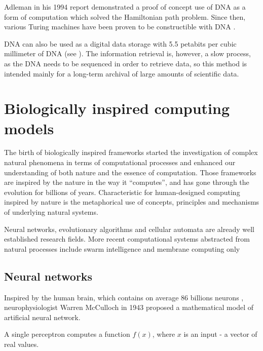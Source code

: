 Adleman in his 1994 report \cite{Adleman1994MolecularComputation} demonstrated a proof of concept use of DNA as a form of computation which solved the Hamiltonian path problem. Since then, various Turing machines have been proven to be constructible with DNA \cite{Kari2000DNAPCP}. 

DNA can also be used as a digital data storage with 5.5 petabits per cubic millimeter of DNA (see \cite{Church2012DNAStorage}). The information retrieval is, however, a slow process, as the DNA needs to be sequenced in order to retrieve data, so this method is intended mainly for a long-term archival of large amounts of scientific data.


\section{Biologically inspired computing models} %
\label{sec:biologically_inspired_computing_models}

The birth of biologically inspired frameworks started the investigation of complex natural phenomena in terms of computational processes and enhanced our understanding of both nature and the essence of computation.
Those frameworks are inspired by the nature in the way it ``computes'', and has gone through the evolution for billions of years. Characteristic for human-designed computing inspired by nature is the metaphorical use of concepts, principles and mechanisms of underlying natural systems.

Neural networks, evolutionary algorithms and cellular automata are already well established research fields. More recent computational systems abstracted from natural processes include swarm intelligence and membrane computing only 

\subsection{Neural networks} %
\label{sub:neural_networks}

Inspired by the human brain, which contains on average 86 billions neurons \cite{Azevedo09NumberOfNeurons}, neurophysiologist Warren McCulloch in 1943 proposed a mathematical model of artificial  neural network.

A single perceptron computes a function $f(x)$, where $x$ is an input - a vector of real values.

